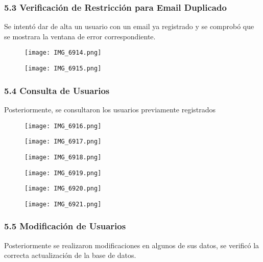 \documentclass[12pt]{article}
\begin{document}
\subsubsection{5.3 Verificación de Restricción para Email Duplicado}
Se intentó dar de alta un usuario con un email ya registrado y se comprobó que se mostrara la ventana de error correspondiente.

\begin{figure}[H]
    \centering
    \texttt{[image: IMG\_6914.png]}
\end{figure}
\begin{figure}[H]
    \centering
    \texttt{[image: IMG\_6915.png]}
\end{figure}

\subsubsection{5.4 Consulta de Usuarios}
Posteriormente, se consultaron los usuarios previamente registrados

\begin{figure}[H]
    \centering
    \texttt{[image: IMG\_6916.png]}
\end{figure}
\begin{figure}[H]
    \centering
    \texttt{[image: IMG\_6917.png]}
\end{figure}

\begin{figure}[H]
    \centering
    \texttt{[image: IMG\_6918.png]}
\end{figure}

\begin{figure}[H]
    \centering
    \texttt{[image: IMG\_6919.png]}
\end{figure}

\begin{figure}[H]
    \centering
    \texttt{[image: IMG\_6920.png]}
\end{figure}

\begin{figure}[H]
    \centering
    \texttt{[image: IMG\_6921.png]}
\end{figure}

\subsubsection{5.5 Modificación de Usuarios}
Posteriormente se realizaron modificaciones en algunos de sus datos, se verificó la correcta actualización de la base de datos.
\end{document}
